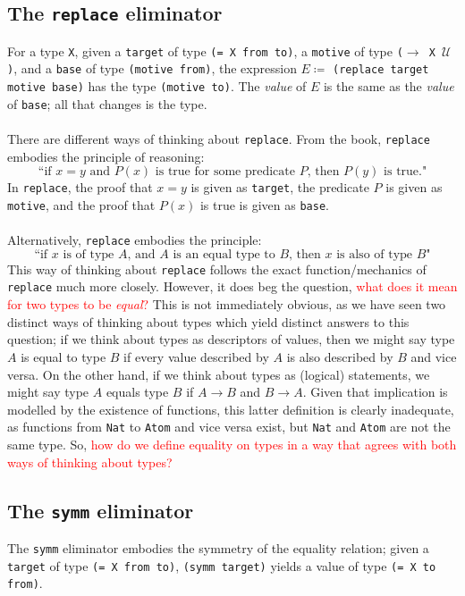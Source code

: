 \documentclass{article}
\newcommand{\ttt}[1]{\texttt{#1}}
\begin{document}
\subsection{The \ttt{replace} eliminator}
For a type \ttt{X}, given a \ttt{target} of type \ttt{(= X from to)}, a \ttt{motive} of type \ttt{(\(\to\) X \(\mathcal{U}\))}, and a \ttt{base} of type \ttt{(motive from)}, the expression \(E \coloneqq \) \ttt{(replace target motive base)} has the type \ttt{(motive to)}. The \textit{value} of \(E\) is the same as the \textit{value} of \ttt{base}; all that changes is the type.
\\ \\
There are different ways of thinking about \ttt{replace}. From the book, \ttt{replace} embodies the principle of reasoning: \[
    \text{``if \(x = y\) and \(P(x)\) is true for some predicate \(P\), then \(P(y)\) is true."}
\]
In \ttt{replace}, the proof that \(x = y\) is given as \ttt{target}, the predicate \(P\) is given as \ttt{motive}, and the proof that \(P(x)\) is true is given as \ttt{base}.
\\ \\
Alternatively, \ttt{replace} embodies the principle: \[
    \text{``if \(x\) is of type \(A\), and \(A\) is an equal type to \(B\), then \(x\) is also of type \(B\)"}
\]
This way of thinking about \ttt{replace} follows the exact function/mechanics of \ttt{replace} much more closely. However, it does beg the question, \textcolor{red}{what does it mean for two types to be \textit{equal}?} This is not immediately obvious, as we have seen two distinct ways of thinking about types which yield distinct answers to this question; if we think about types as descriptors of values, then we might say type \(A\) is equal to type \(B\) if every value described by \(A\) is also described by \(B\) and vice versa. On the other hand, if we think about types as (logical) statements, we might say type \(A\) equals type \(B\) if \(A \to B\) and \(B \to A\). Given that implication is modelled by the existence of functions, this latter definition is clearly inadequate, as functions from \ttt{Nat} to \ttt{Atom} and vice versa exist, but \ttt{Nat} and \ttt{Atom} are not the same type. So, \textcolor{red}{how do we define equality on types in a way that agrees with both ways of thinking about types?}
\subsection{The \ttt{symm} eliminator}
The \ttt{symm} eliminator embodies the symmetry of the equality relation; given a \ttt{target} of type \ttt{(= X from to)}, \ttt{(symm target)} yields a value of type \ttt{(= X to from)}.
\end{document}
